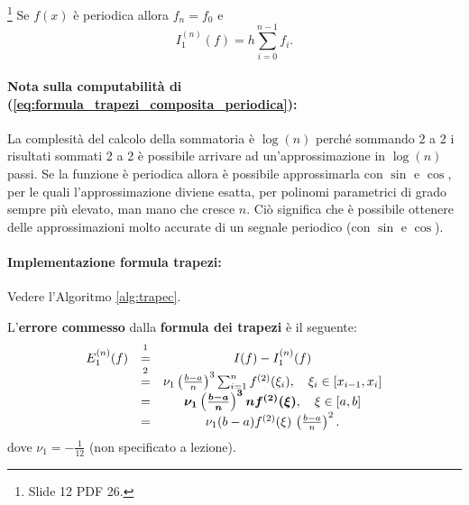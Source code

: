 \addtocounter{footnote}{-1}


\begin{remark}
    \footnote{Slide 12 PDF 26.} Se $f(x)$ è periodica allora $f_n=f_0$ e
    \begin{equation}\label{eq:formula_trapezi_composita_periodica}
    	I_1^{(n)}(f)=h \sum_{i=0}^{n-1}f_i.
    \end{equation}
\end{remark}

\paragraph{Nota sulla computabilità di (\ref{eq:formula_trapezi_composita_periodica}):} La complesità del calcolo della sommatoria è $\log (n)$ perché sommando 2 a 2 i risultati sommati 2 a 2 è possibile arrivare ad un'approssimazione in $\log (n)$ passi. Se la funzione è periodica allora è possibile approssimarla con $\sin$ e $\cos$, per le quali l'approssimazione diviene esatta, per polinomi parametrici di grado sempre più elevato, man mano che cresce $n$. Ciò significa che è possibile ottenere delle approssimazioni molto accurate di un segnale periodico (con $\sin$ e $\cos$).

\paragraph{Implementazione formula trapezi:} Vedere l'Algoritmo \ref{alg:trapec}.

\begin{definition}
    L'\textbf{errore commesso} dalla \textbf{formula dei trapezi} è il seguente:
    \begin{equation}\label{eq:errore_formula_trapezi_composita}
        \begin{matrix}
            E_1^{(n)}(f) &\overset{\footnotemark}{=}& I(f)-I_1^{(n)}(f)\\
            &\overset{\footnotemark}{=}&\nu_1 \left(\frac{b-a}{n}\right)^3 \sum_{i=1}^n f^{(2)}(\xi_i),\quad \xi_i\in[x_{i-1},x_i]\\
            &=&\boldsymbol{\nu_1 \left(\frac{b-a}{n}\right)^{3} n  f^{(2)}(\xi)},\quad \xi\in[a,b] \\
            &=& \nu_1 (b-a)f^{(2)}(\xi)\,\left(\frac{b-a}{n}\right)^2.
        \end{matrix}
    \end{equation}
    dove $\nu_1=-\frac{1}{12}$ (non specificato a lezione).
\end{definition}

